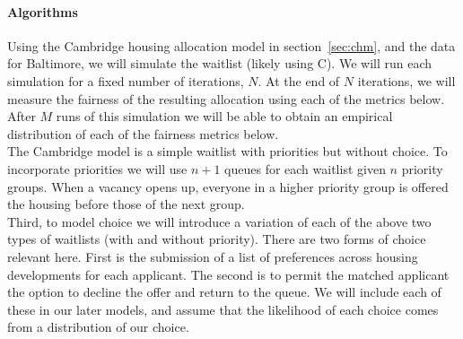 \documentclass[11pt]{article}
\begin{document}
\paragraph{Algorithms}
Using the Cambridge housing allocation model in section~\ref{sec:chm}, and the data for Baltimore, we will simulate the waitlist (likely using C). We will run each simulation for a fixed number of iterations, $N$. At the end of $N$ iterations, we will measure the fairness of the resulting allocation using each of the metrics below. After $M$ runs of this simulation we will be able to obtain an empirical distribution of each of the fairness metrics below. \\
\newline
The Cambridge model is a simple waitlist with priorities but without choice. To incorporate priorities we will use $n+1$ queues for each waitlist given $n$ priority groups. 
When a vacancy opens up, everyone in a higher priority group is offered the housing before those of the next group. \\
\newline
Third, to model choice we will introduce a variation of each of the above two types of waitlists (with and without priority). There are two forms of choice relevant here. First is the submission of a list of preferences across housing developments for each applicant. The second is to permit the matched applicant the option to decline the offer and return to the queue. We will include each of these in our later models, and assume that the likelihood of each choice comes from a distribution of our choice. 
\end{document}
